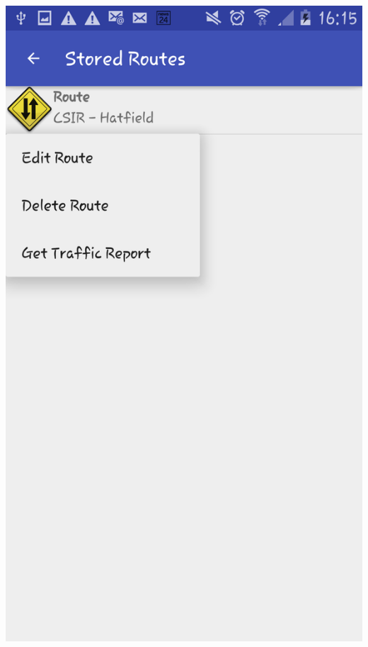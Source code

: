\documentclass[a4paper,12pt]{article}
\begin{document}
\includegraphics[width=\textwidth]{images/Options.png}
\end{document}
